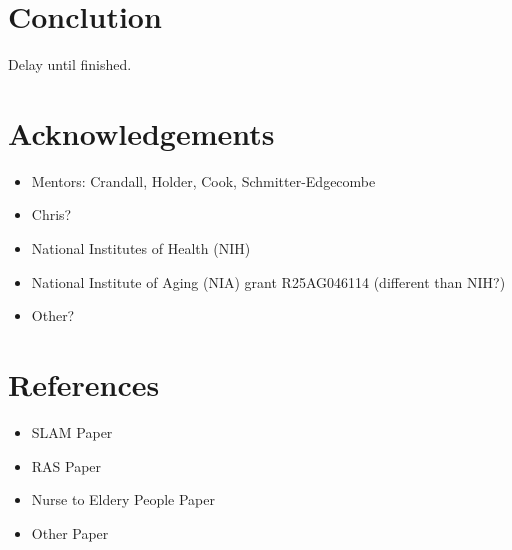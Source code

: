 \documentclass[11pt, draft, a4paper]{IEEEtran}
\begin{document}
\section{Conclution}
Delay until finished.


\section{Acknowledgements}
\begin{itemize}
    \item Mentors: Crandall, Holder, Cook, Schmitter-Edgecombe
    \item Chris?
    \item National Institutes of Health (NIH)
    \item National Institute of Aging (NIA) grant R25AG046114  (different than NIH?)
    \item Other?
\end{itemize}


\section{References}
\begin{itemize}
    \item SLAM Paper
    \item RAS Paper
    \item Nurse to Eldery People Paper
    \item Other Paper
\end{itemize}



\end{document}
